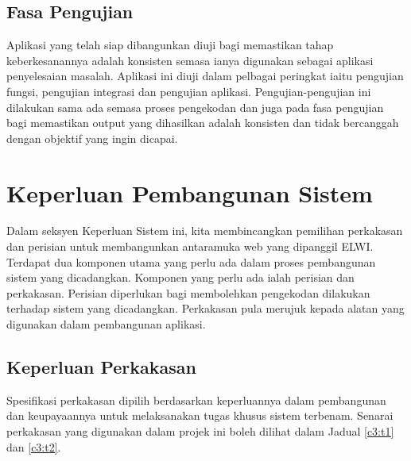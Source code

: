 \subsection{Fasa Pengujian}
Aplikasi yang telah siap dibangunkan diuji bagi memastikan tahap keberkesanannya adalah konsisten semasa ianya digunakan sebagai aplikasi penyelesaian masalah. Aplikasi ini diuji dalam pelbagai peringkat iaitu pengujian fungsi, pengujian integrasi dan pengujian aplikasi. Pengujian-pengujian ini dilakukan sama ada semasa proses pengekodan dan juga pada fasa pengujian bagi memastikan output yang dihasilkan adalah konsisten dan tidak bercanggah dengan objektif yang ingin dicapai.

\section{Keperluan Pembangunan Sistem}
Dalam seksyen Keperluan Sistem ini, kita membincangkan pemilihan perkakasan dan perisian untuk membangunkan antaramuka web yang dipanggil ELWI. Terdapat dua komponen utama yang perlu ada dalam proses pembangunan sistem
yang dicadangkan. Komponen yang perlu ada ialah perisian dan perkakasan. Perisian diperlukan bagi membolehkan pengekodan dilakukan terhadap sistem yang dicadangkan. Perkakasan pula merujuk kepada alatan yang digunakan dalam pembangunan aplikasi.

\newpage
\subsection{Keperluan Perkakasan}

Spesifikasi perkakasan dipilih berdasarkan keperluannya dalam pembangunan dan keupayaannya untuk melaksanakan tugas khusus sistem terbenam. Senarai perkakasan yang digunakan dalam projek ini boleh dilihat dalam Jadual \ref{c3:t1} dan \ref{c3:t2}.

\begin{table}[H]
	\newline \newline
    \caption[Spesifikasi Perkakasan Pembangunan]{Spesifikasi Perkakasan Pembangunan}
    \label{c3:t1}
\end{table}

